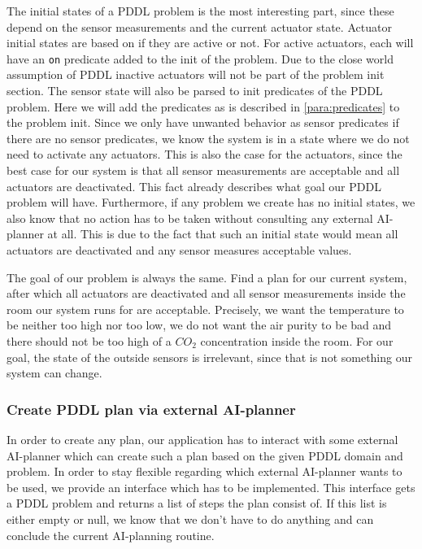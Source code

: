 The initial states of a PDDL problem is the most interesting part, since these depend on the sensor measurements and the current actuator state.
Actuator initial states are based on if they are active or not.
For active actuators, each will have an \texttt{on} predicate added to the init of the problem.
Due to the close world assumption of PDDL inactive actuators will not be part of the problem init section.
The sensor state will also be parsed to init predicates of the PDDL problem.
Here we will add the predicates as is described in \cref{para:predicates} to the problem init.
Since we only have unwanted behavior as sensor predicates if there are no sensor predicates, we know the system is in a state where we do not need to activate any actuators.
This is also the case for the actuators, since the best case for our system is that all sensor measurements are acceptable and all actuators are deactivated.
This fact already describes what goal our PDDL problem will have.
Furthermore, if any problem we create has no initial states, we also know that no action has to be taken without consulting any external AI-planner at all.
This is due to the fact that such an initial state would mean all actuators are deactivated and any sensor measures acceptable values.

The goal of our problem is always the same.
Find a plan for our current system, after which all actuators are deactivated and all sensor measurements inside the room our system runs for are acceptable.
Precisely, we want the temperature to be neither too high nor too low, we do not want the air purity to be bad and there should not be too high of a $CO_2$ concentration inside the room.
For our goal, the state of the outside sensors is irrelevant, since that is not something our system can change.

\subsubsection{Create PDDL plan via external AI-planner}\label{subsubsec:create-pddl-plan-via-external-ai-planner}
In order to create any plan, our application has to interact with some external AI-planner which can create such a plan based on the given PDDL domain and problem.
In order to stay flexible regarding which external AI-planner wants to be used, we provide an interface which has to be implemented.
This interface gets a PDDL problem and returns a list of steps the plan consist of.
If this list is either empty or null, we know that we don't have to do anything and can conclude the current AI-planning routine.

